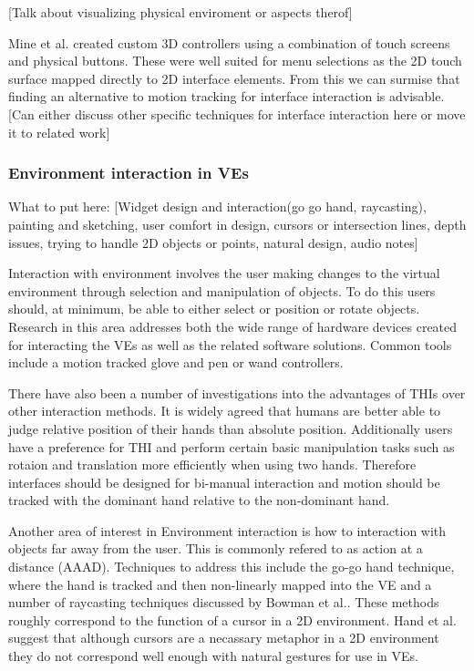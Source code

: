 \documentclass{sig-alternate-05-2015}
\begin{document}
 [Talk about visualizing physical enviroment or aspects therof] 
 
 Mine et al. created custom 3D controllers using a combination of touch screens and physical buttons.\cite{Mine2014} These were well suited for menu selections as the 2D touch surface mapped directly to 2D interface elements. From this we can surmise that finding an alternative to motion tracking for interface interaction is advisable. [Can either discuss other specific techniques for interface interaction here or move it to related work]
 
 
\subsubsection{Environment interaction in VEs}
What to put here: [Widget design and interaction(go go hand, raycasting), painting and sketching, user comfort in design, cursors or intersection lines, depth issues, trying to handle 2D objects or points, natural design, audio notes]


 Interaction with environment involves the user making changes to the virtual environment through selection and manipulation of objects. To do this users should, at minimum, be able to either select or position or rotate objects\cite{Bowman2001}. Research in this area addresses both the wide range of hardware devices created for interacting the VEs as well as the related software solutions. Common tools include a motion tracked glove \cite{Zimmerman1986} and pen or wand controllers.\cite{Schultheis2012}
 
 There have also been a number of investigations into the advantages of THIs over other interaction methods. It is widely agreed that humans are better able to judge relative position of their hands than absolute position.\cite{Bowman1998, Buxton1986} Additionally users have a preference for THI\cite{Buxton1986} and perform certain basic manipulation tasks such as rotaion and translation more efficiently when using two hands.\cite{Schultheis2012} Therefore interfaces should be designed for bi-manual interaction and motion should be tracked with the dominant hand relative to the non-dominant hand.\cite{Hinckley1994}
 
 Another area of interest in Environment interaction is how to interaction with objects far away from the user. This is commonly refered to as action at a distance (AAAD). Techniques to address this include the go-go hand technique\cite{Poupyrev1996}, where the hand is tracked and then non-linearly mapped into the VE and a number of raycasting techniques discussed by Bowman et al.\cite{Bowman2001}. These methods roughly correspond to the function of a cursor in a 2D environment. Hand et al. suggest that although cursors are a necassary metaphor in a 2D environment they do not correspond well enough with natural gestures for use in VEs.\cite{Hand1997}
 
\end{document}
